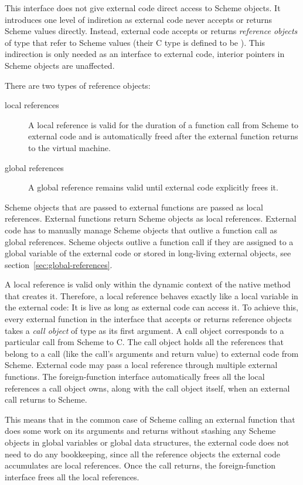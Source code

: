 This interface does not give external code direct access to Scheme
objects.  It introduces one level of indiretion as external code never
accepts or returns Scheme values directly.  Instead, external code
accepts or returns \emph{reference objects} of type 
that refer to Scheme values (their C type is defined to be
).  This indirection is only needed as an interface
to external code, interior pointers in Scheme objects are unaffected.

There are two types of reference objects:
%
\begin{description}
\item[local references] A local reference is valid for the duration of
  a function call from Scheme to external code and is automatically
  freed after the external function returns to the virtual machine.

\item[global references] A global reference remains valid until
  external code explicitly frees it.
\end{description}
%
Scheme objects that are passed to external functions are
passed as local references.  External functions return Scheme objects
as local references.  External code has to manually manage Scheme
objects that outlive a function call as global references.  Scheme
objects outlive a function call if they are assigned to a global
variable of the external code or stored in long-living external
objects, see section~\ref{sec:global-references}.

A local reference is valid only within the dynamic context of the
native method that creates it.  Therefore, a local reference behaves
exactly like a local variable in the external code: It is live as long
as external code can access it.  To achieve this, every external
function in the interface that accepts or returns reference objects
takes a \emph{call object} of type  as its first
argument.  A call object corresponds to a particular call from Scheme
to C.  The call object holds all the references that belong to a call
(like the call's arguments and return value) to external code from
Scheme.  External code may pass a local reference through multiple
external functions.  The foreign-function interface automatically
frees all the local references a call object owns, along with the call
object itself, when an external call returns to Scheme.

This means that in the common case of Scheme calling an external
function that does some work on its arguments and returns without
stashing any Scheme objects in global variables or global data
structures, the external code does not need to do any bookkeeping,
since all the reference objects the external code accumulates are
local references.  Once the call returns, the foreign-function
interface frees all the local references.

